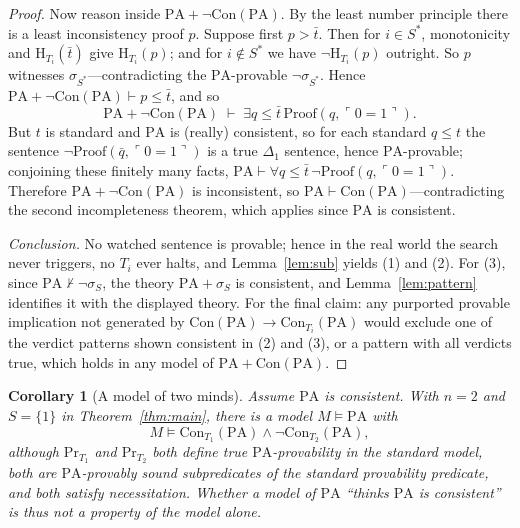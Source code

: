 \documentclass[11pt]{amsart}
\newtheorem{corollary}[theorem]{Corollary}
\theoremstyle{definition}
\theoremstyle{remark}
\newcommand{\PA}{\mathrm{PA}}
\newcommand{\Con}{\mathrm{Con}}
\newcommand{\Pf}{\mathrm{Proof}}
\newcommand{\Prov}{\mathrm{Pr}}
\newcommand{\HT}[1]{\mathrm{H}_{#1}}
\newcommand{\godel}[1]{\ulcorner #1 \urcorner}
\begin{document}
\begin{proof}
Now reason inside $\PA+\neg\Con(\PA)$. By the least number principle
there is a least inconsistency proof $p$. Suppose first $p>\bar t$. Then
for $i\in S^*$, monotonicity and $\HT{T_i}(\bar t)$ give $\HT{T_i}(p)$;
and for $i\notin S^*$ we have $\neg\HT{T_i}(p)$ outright. So $p$
witnesses $\sigma_{S^*}$---contradicting the $\PA$-provable
$\neg\sigma_{S^*}$. Hence $\PA+\neg\Con(\PA)\vdash p\le\bar t$, and so
\[
\PA+\neg\Con(\PA)\;\vdash\;\exists q\le\bar t\,\Pf(q,\godel{0{=}1}).
\]
But $t$ is standard and $\PA$ is (really) consistent, so for each
standard $q\le t$ the sentence $\neg\Pf(\bar q,\godel{0{=}1})$ is a true
$\Delta_1$ sentence, hence $\PA$-provable; conjoining these finitely many
facts, $\PA\vdash\forall q\le\bar t\,\neg\Pf(q,\godel{0{=}1})$.
Therefore $\PA+\neg\Con(\PA)$ is inconsistent, so
$\PA\vdash\Con(\PA)$---contradicting the second incompleteness theorem,
which applies since $\PA$ is consistent.

\emph{Conclusion.} No watched sentence is provable; hence in the real
world the search never triggers, no $T_i$ ever halts, and
Lemma~\ref{lem:sub} yields (1) and (2). For (3), since
$\PA\nvdash\neg\sigma_S$, the theory $\PA+\sigma_S$ is consistent, and
Lemma~\ref{lem:pattern} identifies it with the displayed theory. For the
final claim: any purported provable implication not generated by
$\Con(\PA)\to\Con_{T_i}(\PA)$ would exclude one of the verdict patterns
shown consistent in (2) and (3), or a pattern with all verdicts true,
which holds in any model of $\PA+\Con(\PA)$.
\end{proof}

\begin{corollary}[A model of two minds]\label{cor:two-minds}
Assume $\PA$ is consistent. With $n=2$ and $S=\{1\}$ in
Theorem~\ref{thm:main}, there is a model $M\models\PA$ with
\[
M\models \Con_{T_1}(\PA)\wedge\neg\Con_{T_2}(\PA),
\]
although $\Prov_{T_1}$ and $\Prov_{T_2}$ both define true
$\PA$-provability in the standard model, both are $\PA$-provably sound
subpredicates of the standard provability predicate, and both satisfy
necessitation. Whether a model of $\PA$ ``thinks $\PA$ is consistent'' is
thus not a property of the model alone.
\end{corollary}
\end{document}

